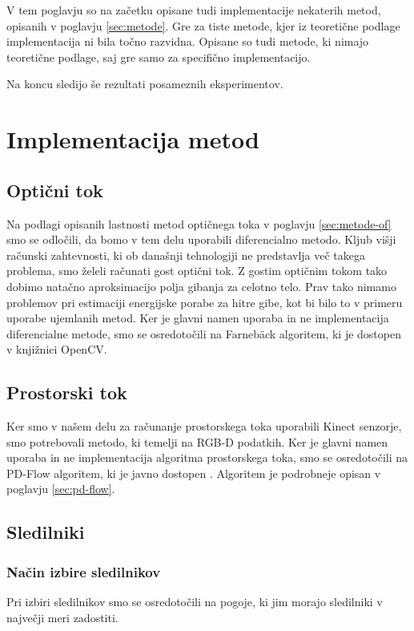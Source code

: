 V tem poglavju so na začetku opisane tudi implementacije nekaterih metod, opisanih v poglavju \ref{sec:metode}. Gre za tiste metode, kjer iz teoretične podlage implementacija ni bila točno razvidna. Opisane so tudi metode, ki nimajo teoretične podlage, saj gre samo za specifično implementacijo.

Na koncu sledijo še rezultati posameznih eksperimentov.







\section{Implementacija metod}
\subsection{Optični tok}
Na podlagi opisanih lastnosti metod optičnega toka v poglavju \ref{sec:metode-of} smo se odločili, da bomo v tem delu uporabili diferencialno metodo. Kljub višji računski zahtevnosti, ki ob današnji tehnologiji ne predstavlja več takega problema, smo želeli računati gost optični tok. Z gostim optičnim tokom tako dobimo natačno aproksimacijo polja gibanja za celotno telo. Prav tako nimamo problemov pri estimaciji energijske porabe za hitre gibe, kot bi bilo to v primeru uporabe ujemlanih metod. Ker je glavni namen uporaba in ne implementacija diferencialne metode, smo se osredotočili na Farneb{\"a}ck algoritem, ki je dostopen v knjižnici OpenCV.

\subsection{Prostorski tok}
Ker smo v našem delu za računanje prostorskega toka uporabili Kinect senzorje, smo potrebovali metodo, ki temelji na RGB-D podatkih. Ker je glavni namen uporaba in ne implementacija algoritma prostorskega toka, smo se osredotočili na PD-Flow algoritem, ki je javno dostopen \cite{jaimez2015primal}. Algoritem je podrobneje opisan v poglavju \ref{sec:pd-flow}.

\subsection{Sledilniki}
\subsubsection{Način izbire sledilnikov}\label{sec:pogoji-sledilnikov}
Pri izbiri sledilnikov smo se osredotočili na pogoje, ki jim morajo sledilniki v največji meri zadostiti.

